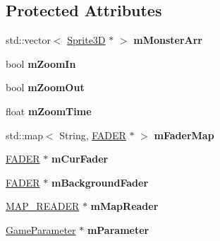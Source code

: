 \subsection*{Protected Attributes}
\begin{DoxyCompactItemize}
\item 
\hypertarget{class_stage_extra_a0c2f1ae1cb32753afbae6f559d7a80d8}{
std::vector$<$ \hyperlink{class_sprite3_d}{Sprite3D} $\ast$ $>$ {\bfseries mMonsterArr}}
\label{class_stage_extra_a0c2f1ae1cb32753afbae6f559d7a80d8}

\item 
\hypertarget{class_stage_extra_aba4c1fb649ff0d221ca699b460bbe7b8}{
bool {\bfseries mZoomIn}}
\label{class_stage_extra_aba4c1fb649ff0d221ca699b460bbe7b8}

\item 
\hypertarget{class_stage_extra_a1bd90413392b0d5e52fcf0e4272aab9f}{
bool {\bfseries mZoomOut}}
\label{class_stage_extra_a1bd90413392b0d5e52fcf0e4272aab9f}

\item 
\hypertarget{class_stage_extra_a39dadcc193c3b5ead86189073403181f}{
float {\bfseries mZoomTime}}
\label{class_stage_extra_a39dadcc193c3b5ead86189073403181f}

\item 
\hypertarget{class_stage_extra_ab61fb55ae273cde20d6c9fcd681a3bce}{
std::map$<$ String, \hyperlink{class_f_a_d_e_r}{FADER} $\ast$ $>$ {\bfseries mFaderMap}}
\label{class_stage_extra_ab61fb55ae273cde20d6c9fcd681a3bce}

\item 
\hypertarget{class_stage_extra_ad7cd9551acb120a47418ef906bd14688}{
\hyperlink{class_f_a_d_e_r}{FADER} $\ast$ {\bfseries mCurFader}}
\label{class_stage_extra_ad7cd9551acb120a47418ef906bd14688}

\item 
\hypertarget{class_stage_extra_a0be51ab990fa25a5ed1c404e2a85f21a}{
\hyperlink{class_f_a_d_e_r}{FADER} $\ast$ {\bfseries mBackgroundFader}}
\label{class_stage_extra_a0be51ab990fa25a5ed1c404e2a85f21a}

\item 
\hypertarget{class_stage_extra_a40146a1c1aa6658541817f52e75fdb14}{
\hyperlink{class_m_a_p___r_e_a_d_e_r}{MAP\_\-READER} $\ast$ {\bfseries mMapReader}}
\label{class_stage_extra_a40146a1c1aa6658541817f52e75fdb14}

\item 
\hypertarget{class_stage_extra_af9e733032313c4349b41df8ba0b4b405}{
\hyperlink{class_game_parameter}{GameParameter} $\ast$ {\bfseries mParameter}}
\label{class_stage_extra_af9e733032313c4349b41df8ba0b4b405}


\end{DoxyCompactItemize}
